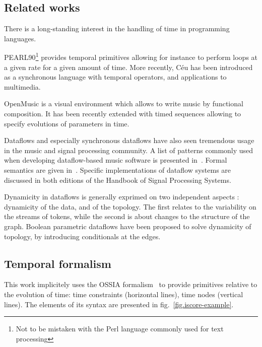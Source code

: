 \documentclass{article}
\begin{document}
\subsection{Related works}
There is a long-standing interest in the handling of time in programming languages.

PEARL90\cite{halang2001safe}\footnote{Not to be mistaken with the Perl language commonly used for text processing} provides temporal primitives allowing for instance to perform loops at a given rate for a given amount of time.
More recently, Céu has been introduced as a synchronous language with temporal operators, and applications to multimedia\cite{Santos:2016:CLI:2976796.2976856}.

OpenMusic is a visual environment which allows to write music by functional composition.
It has been recently extended with timed sequences allowing to specify evolutions of parameters in time\cite{garcia:hal-01484077}.

Dataflows and especially synchronous dataflows have also seen tremendous usage in the music and signal processing community. 
A list of patterns commonly used when developing dataflow-based music software is presented in~\cite{arumi2006dataflow}.
Formal semantics are given in~\cite{benveniste_data-flow_1993}.
Specific implementations of dataflow systems are discussed in both editions of the Handbook of Signal Processing Systems\cite{bhattacharyya_handbook_2013}. 

Dynamicity in dataflows is generally exprimed on two independent aspects : dynamicity of the data, and of the topology.
The first relates to the variability on the streams of tokens, while the second is about changes to the structure of the graph. 
Boolean parametric dataflows\cite{bempelis2015boolean} have been proposed to solve dynamicity of topology, by introducing conditionals at the edges.

\subsection{Temporal formalism}
This work implicitely uses the OSSIA formalism~\cite{celerier2015ossia} to provide primitives relative to the evolution of time: time constraints (horizontal lines), time nodes (vertical lines). 
The elements of its syntax are presented in fig.~\ref{fig.iscore-example}.
    
\end{document}
